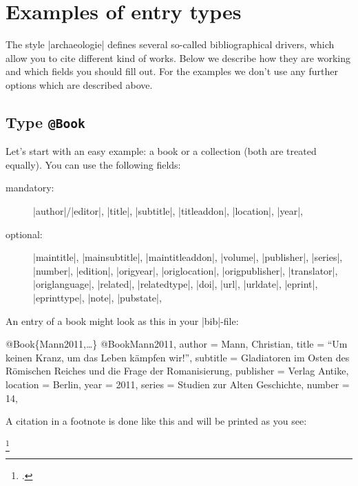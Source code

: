 \documentclass[a4paper,
10pt,
greek,
french,
spanish,
italian,
ngerman,
english
]{ltxdoc}
\begin{document}
\section{Examples of entry types}\label{beispiele}
The style |archaeologie| defines several so-called bibliographical drivers,
which allow you to cite different kind of works.
Below we describe how they are working and which fields you should fill out.
For the examples we don't use any further options which are described above.

\subsection{Type \texttt{@Book}}\label{book}
Let’s start with an easy example: 
a book or a collection (both are treated equally).
You can use the following fields:
\begin{description}
\item[mandatory:] 
|author|/|editor|, 
|title|, |subtitle|, |titleaddon|,
|location|, |year|,
\item[optional:]
|maintitle|, |mainsubtitle|, |maintitleaddon|, |volume|, 
|publisher|, |series|, |number|, |edition|, 
|origyear|, |origlocation|, |origpublisher|, 
|translator|, |origlanguage|,
|related|, |relatedtype|,
|doi|, |url|, |urldate|, |eprint|, |eprinttype|, |note|, |pubstate|, 
 \end{description}
 
 
An entry of a book might look as this in your |bib|-file:
\begin{bibexample}[label=Mann2011]{{@}Book\{Mann2011,…\}}
@Book{Mann2011,
  author    = {Mann, Christian},
  title     = {\enquote{Um keinen Kranz, um das Leben kämpfen wir!}},
  subtitle  = {Gladiatoren im Osten des Römischen Reiches und die Frage der Romanisierung},
  publisher = {Verlag Antike},
  location  = Berlin,   %
  year      = {2011},
  series    = {Studien zur Alten Geschichte},
  number    = {14},
}
\end{bibexample}

A citation in a footnote is done like this and will be printed as you see:
\begin{example}
\footnote{\cite[Vgl.][142--144]{Mann2011}.}
\end{example} 
\end{document}
